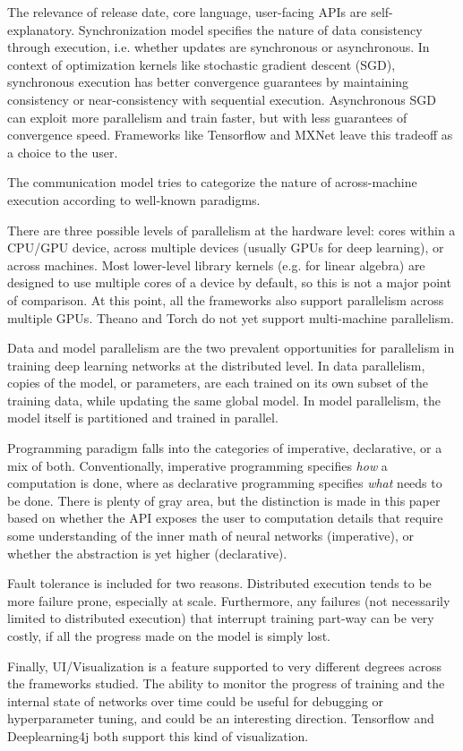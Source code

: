 The relevance of release date, core language, user-facing APIs are self-explanatory. Synchronization model specifies the nature of data consistency through execution, i.e. whether updates are synchronous or asynchronous. In context of optimization kernels like stochastic gradient descent (SGD), synchronous execution has better convergence guarantees by maintaining consistency or near-consistency with sequential execution. Asynchronous SGD can exploit more parallelism and train faster, but with less guarantees of convergence speed. Frameworks like Tensorflow and MXNet leave this tradeoff as a choice to the user. 

The communication model tries to categorize the nature of across-machine execution according to well-known paradigms.

There are three possible levels of parallelism at the hardware level: cores within a CPU/GPU device, across multiple devices (usually GPUs for deep learning), or across machines. Most lower-level library kernels (e.g. for linear algebra) are designed to use multiple cores of a device by default, so this is not a major point of comparison. At this point, all the frameworks also support parallelism across multiple GPUs. Theano and Torch do not yet support multi-machine parallelism. 

Data and model parallelism are the two prevalent opportunities for parallelism in training deep learning networks at the distributed level. In data parallelism, copies of the model, or parameters, are each trained on its own subset of the training data, while updating the same global model. In model parallelism, the model itself is partitioned and trained in parallel. 

Programming paradigm falls into the categories of imperative, declarative, or a mix of both. Conventionally, imperative programming specifies \textit{how} a computation is done, where as declarative programming specifies \textit{what} needs to be done. There is plenty of gray area, but the distinction is made in this paper based on whether the API exposes the user to computation details that require some understanding of the inner math of neural networks (imperative), or whether the abstraction is yet higher (declarative). 

Fault tolerance is included for two reasons. Distributed execution tends to be more failure prone, especially at scale. Furthermore, any failures (not necessarily limited to distributed execution) that interrupt training part-way can be very costly, if all the progress made on the model is simply lost. 

Finally, UI/Visualization is a feature supported to very different degrees across the frameworks studied. The ability to monitor the progress of training and the internal state of networks over time could be useful for debugging or hyperparameter tuning, and could be an interesting direction. Tensorflow and Deeplearning4j both support this kind of visualization. 
